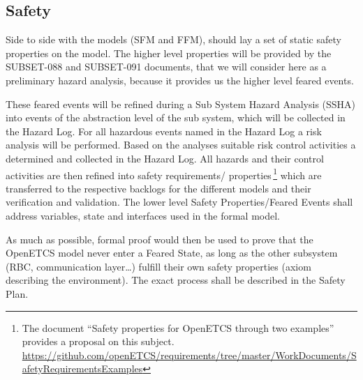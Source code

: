 \documentclass{template/openetcs_article}
\begin{document}


\subsection{Safety}
\label{safety}
Side to side with the models (SFM and FFM), should lay a set of  
static safety properties on the model. The higher level properties will be provided 
by the SUBSET-088 and SUBSET-091 documents, that we will consider here as a preliminary hazard analysis, 
because it provides us the higher level feared events.

These feared events will be refined during a Sub System Hazard Analysis (SSHA) into events of the abstraction level of the sub system, 
which will be collected in the Hazard Log. For all hazardous events named in the Hazard Log a risk analysis will be performed.
Based on the analyses suitable risk control activities a determined and collected in the Hazard Log. All hazards and their 
control activities are then refined into safety requirements/ properties\,\footnote{The document ``Safety properties for 
OpenETCS through two examples'' provides a proposal on this subject.
\url{https://github.com/openETCS/requirements/tree/master/WorkDocuments/SafetyRequirementsExamples}} which are transferred 
to the respective backlogs for the different models and their verification and validation.
The lower level Safety Properties/Feared Events shall address variables, state and interfaces used in the formal model.

As much as possible, formal proof would then be used to prove that the OpenETCS model never enter a Feared State, 
as long as the other subsystem (RBC, communication layer\dots) fulfill their own safety properties 
(axiom describing the environment). The exact process shall be described in the Safety Plan.
 


\end{document}
